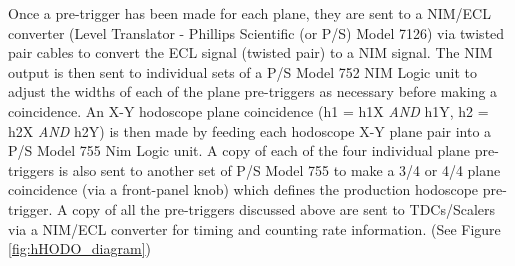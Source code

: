 \documentclass[11pt]{article}
\begin{document}
\indent Once a pre-trigger has been made for each plane, they are sent to a NIM/ECL converter (Level Translator - Phillips Scientific (or P/S) Model 7126) via twisted pair cables to convert the ECL signal (twisted pair)
to a NIM signal. The NIM output is then sent to individual sets of a P/S Model 752 NIM Logic unit to adjust the widths of each of the plane pre-triggers as necessary before making a coincidence. An X-Y hodoscope plane
coincidence (h1 = h1X \textit{AND} h1Y, h2 = h2X \textit{AND} h2Y) is then made by feeding each hodoscope X-Y plane pair into a P/S Model 755 Nim Logic unit. A copy of each of the four individual plane pre-triggers is also sent to another set of P/S Model 755 to make a 3/4 or
4/4 plane coincidence (via a front-panel knob) which defines the production hodoscope pre-trigger. A copy of all the pre-triggers discussed above are sent to TDCs/Scalers via a NIM/ECL converter for timing and counting rate information. (See Figure \ref{fig:hHODO_diagram}) \\
\end{document}
